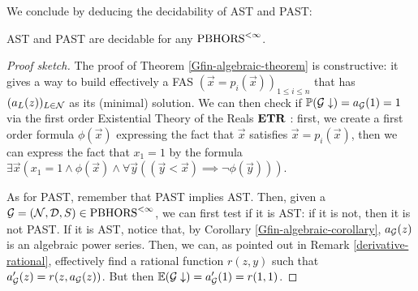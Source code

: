 We conclude by deducing the decidability of AST and PAST:
\begin{theorem}\label{thm:astpast}
\label{th:decidability}
	AST and PAST are decidable for any $\text{PBHORS}^{<\infty}$.	
\end{theorem}
\begin{proof}[Proof sketch]
The  proof of Theorem \ref{Gfin-algebraic-theorem} is constructive: it gives a way to build effectively a FAS $(\vec x = p_i(\vec x))_{1 \leq i \leq n}$ that has $(a_L(z))_{L \in \mathcal{N}}$ as its (minimal) solution.
We can then check if $\mathbb P(\mathcal{G}\downarrow) = a_{\mathcal{G}}(1)=1$ via the first order Existential Theory of the Reals $\mathbf{ETR}$ \cite{DBLP:journals/jacm/EtessamiY09}: first, we create a first order formula $\phi( \vec x)$ expressing the fact that $\vec x$ satisfies $\vec x = p_i(\vec x)$, then we can express the fact that $x_1=1$ by the formula $\exists \vec{x}(x_1=1 \land \phi(\vec x) \land \forall \vec y ((\vec y < \vec x) \implies \neg \phi(\vec y)  ))$.

As for PAST, remember that PAST implies AST. Then, given a $\mathcal{G}=(\mathcal{N}, \mathcal{D}, S) \in \text{PBHORS}^{<\infty}$, we can first test if it is AST: if it is not, then it is not PAST. If it is AST, notice that, by Corollary \ref{Gfin-algebraic-corollary}, $a_{\mathcal{G}}(z)$ is an algebraic power series. Then, we can, as pointed out in Remark \ref{derivative-rational}, effectively find a rational function $r(z, y)$ such that $a'_{\mathcal{G}}(z)= r(z, a_{\mathcal{G}}(z)) $. But then $\mathbb E(\mathcal{G}\downarrow) =a'_{\mathcal{G}}(1)= r(1,1)$.
\end{proof}
%
%
%
%
%
%
%
%
%
%
%
